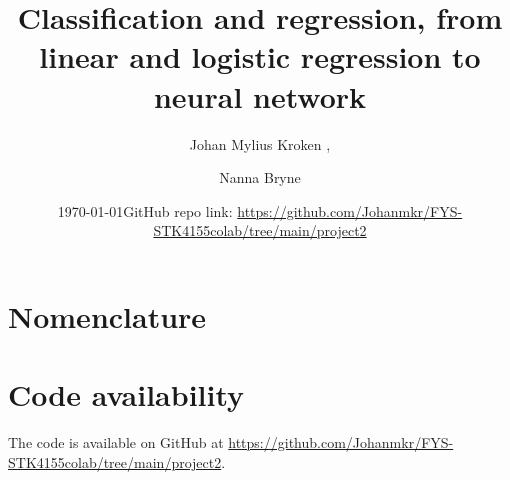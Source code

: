 






\title{Classification and regression, from linear and logistic regression to neural network} 

\author{Johan Mylius Kroken
,
\and
Nanna Bryne
}
\date{\today    \quad GitHub repo link: \url{https://github.com/Johanmkr/FYS-STK4155colab/tree/main/project2}}  

\maketitle









\section*{Nomenclature}




%


\section*{Code availability}
The code is available on GitHub at \url{https://github.com/Johanmkr/FYS-STK4155colab/tree/main/project2}.





